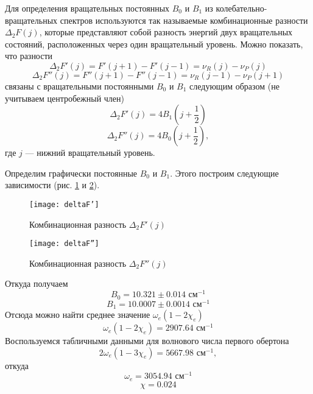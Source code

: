 Для определения вращательных постоянных $B_0$ и $B_1$ из
колебательно-вращательных спектров используются так называемые
комбинационные разности $\Delta_2F(j)$, которые представляют собой разность энергий двух вращательных состояний, расположенных через
один вращательный уровень. Можно показать, что разности
\begin{equation}
\label{eq:deltaF'}
\Delta_2F'(j)=F'(j+1)-F'(j-1)=\nu_R(j)-\nu_P(j)
\end{equation}
\begin{equation}
\label{eq:deltaF''}
\Delta_2F''(j)=F''(j+1)-F''(j-1)=\nu_R(j-1)-\nu_P(j+1)
\end{equation}
связаны с вращательными постоянными $B_0$ и $B_1$ следующим образом (не учитываем центробежный член)
\begin{equation}
\label{eq:deltaF'B}
\Delta_2F'(j)=4B_1(j+\frac{1}{2})
\end{equation}
\begin{equation}
\label{eq:deltaF''B}
\Delta_2F''(j)=4B_0(j+\frac{1}{2}),
\end{equation}
где $j$ --- нижний вращательный уровень.

Определим графически постоянные $B_0$ и $B_1$. Этого построим следующие зависимости (рис. \ref{deltaF'} и \ref{deltaF''}).

\begin{figure}[h!]
	\centering
	\texttt{[image: deltaF']}
	\caption{Комбинационная разность $\Delta_2F'(j)$}
	\label{deltaF'}
\end{figure}
\vspace{2cm}
\begin{figure}[h!]
	\centering
	\texttt{[image: deltaF'']}
	\caption{Комбинационная разность $\Delta_2F''(j)$}
	\label{deltaF''}
\end{figure}
\noindent Откуда получаем
\begin{equation}
B_0 = 10.321\pm0.014 \text{ см$^{-1}$}
\end{equation}
\begin{equation}
B_1 = 10.0007\pm0.0014 \text{ см$^{-1}$}
\end{equation}
Отсюда можно найти среднее значение $\omega_e(1-2\chi_e)$
\begin{equation}
\omega_e(1-2\chi_e) = 2907.64 \text{ см$^{-1}$}
\end{equation}
Воспользуемся табличными данными для волнового числа первого обертона $$2\omega_e(1-3\chi_e) = 5667.98 \text{ см$^{-1}$},$$ откуда
\begin{equation}
\omega_e = 3054.94 \text{ см$^{-1}$}
\end{equation}
\begin{equation}
\chi = 0.024
\end{equation}

